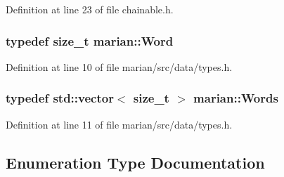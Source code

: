 Definition at line 23 of file chainable.\+h.

\subsubsection[{\texorpdfstring{Word}{Word}}]{\setlength{\rightskip}{0pt plus 5cm}typedef size\+\_\+t {\bf marian\+::\+Word}}\hypertarget{namespacemarian_a5db8bee455c97a62d6a525dc48efe4c2}{}\label{namespacemarian_a5db8bee455c97a62d6a525dc48efe4c2}


Definition at line 10 of file marian/src/data/types.\+h.

\subsubsection[{\texorpdfstring{Words}{Words}}]{\setlength{\rightskip}{0pt plus 5cm}typedef std\+::vector$<$ size\+\_\+t $>$ {\bf marian\+::\+Words}}\hypertarget{namespacemarian_a5385eef6e49dd8f789f616ef579dea3f}{}\label{namespacemarian_a5385eef6e49dd8f789f616ef579dea3f}


Definition at line 11 of file marian/src/data/types.\+h.



\subsection{Enumeration Type Documentation}
